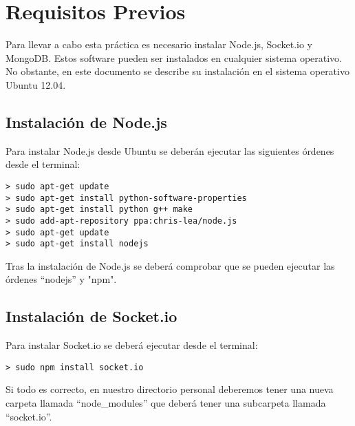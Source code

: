 \documentclass[12pt, a4paper, spanish]{scrartcl}
\begin{document}


\tableofcontents

\newpage

\section{Requisitos Previos}
\label{req}

Para llevar a cabo esta práctica es necesario instalar Node.js, Socket.io y MongoDB. Estos software pueden ser instalados en cualquier sistema operativo. No obstante, en este documento se describe su instalación en el sistema operativo Ubuntu 12.04.

\subsection{Instalación de Node.js}

Para instalar Node.js desde Ubuntu se deberán ejecutar las siguientes órdenes desde el terminal:

\begin{lstlisting}
> sudo apt-get update
> sudo apt-get install python-software-properties
> sudo apt-get install python g++ make
> sudo add-apt-repository ppa:chris-lea/node.js
> sudo apt-get update
> sudo apt-get install nodejs
\end{lstlisting}

Tras la instalación de Node.js se deberá comprobar que se pueden ejecutar las órdenes ``nodejs'' y "npm".

\subsection{Instalación de Socket.io}

Para instalar Socket.io se deberá ejecutar desde el terminal:

\begin{lstlisting}
> sudo npm install socket.io
\end{lstlisting}

Si todo es correcto, en nuestro directorio personal deberemos tener una nueva carpeta llamada ``node\_modules'' que deberá tener una subcarpeta llamada ``socket.io''.
\end{document}
